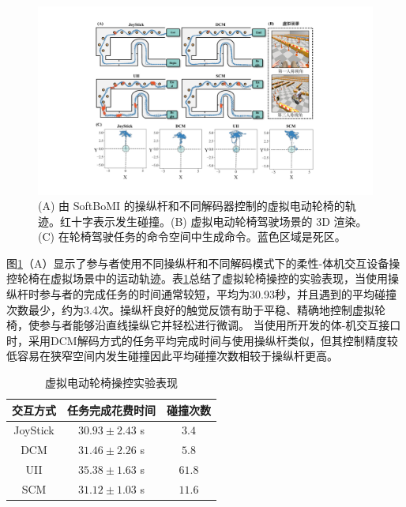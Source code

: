 \begin{figure}[!t]
    \includegraphics[width=1\textwidth]{figures/3-Fig-14.pdf}
    \caption{(A) 由 SoftBoMI 的操纵杆和不同解码器控制的虚拟电动轮椅的轨迹。红十字表示发生碰撞。(B) 虚拟电动轮椅驾驶场景的 3D 渲染。 (C) 在轮椅驾驶任务的命令空间中生成命令。蓝色区域是死区。}
    \label{fig:3-14}
\end{figure}  

图\ref{fig:3-14}（A）显示了参与者使用不同操纵杆和不同解码模式下的柔性-体机交互设备操控轮椅在虚拟场景中的运动轨迹。表\ref{tab3-2}总结了虚拟轮椅操控的实验表现，当使用操纵杆时参与者的完成任务的时间通常较短，平均为30.93秒，并且遇到的平均碰撞次数最少，约为3.4次。操纵杆良好的触觉反馈有助于平稳、精确地控制虚拟轮椅，使参与者能够沿直线操纵它并轻松进行微调。 当使用所开发的体-机交互接口时，采用DCM解码方式的任务平均完成时间与使用操纵杆类似，但其控制精度较低容易在狭窄空间内发生碰撞因此平均碰撞次数相较于操纵杆更高。  

\begin{table}
 \centering
 \caption{虚拟电动轮椅操控实验表现}
 \setlength{\tabcolsep}{5pt}
 \begin{tabular}{c c c}
 \hline\hline
  交互方式 & 任务完成花费时间 & 碰撞次数  \\  
 \hline
 JoyStick&        $30.93\pm 2.43$        s&        $3.4$         \\ 
 DCM&        $31.46\pm 2.26$        s&        $5.8$         \\ 
 UII&        $35.38\pm 1.63$        s&        $61.8$         \\ 
 SCM&        $31.12\pm 1.03$        s&        $11.6$         \\  
 \hline\hline
 \end{tabular}
 \label{tab3-2}
\end{table}     

